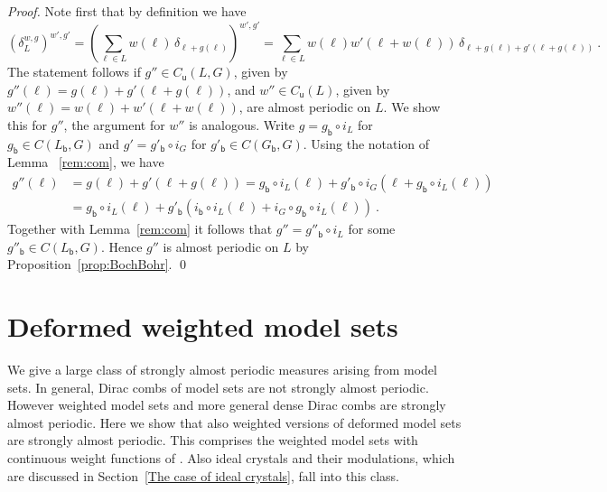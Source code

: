 \documentclass[11pt, a4wide]{amsart}
\numberwithin{lemma}{section}
\begin{document}
\begin{proof}
Note first that by definition we have
%
\begin{displaymath}
(\delta_L^{w,g})^{w',g'} = \left(\sum_{\ell\in L} w(\ell) \, \delta_{\ell+g(\ell)}\right)^{w',g'}
=\sum_{\ell \in L} w(\ell) w'(\ell+w(\ell)) \, \delta_{\ell+g(\ell)+g'(\ell+g(\ell))} \ .
\end{displaymath}
%
The statement follows if $g''\in C_\mathsf{u}(L, G)$, given by $g''(\ell)=g(\ell)+g'(\ell+g(\ell))$, and $w''\in C_\mathsf{u}(L)$, given by $w''(\ell)=w(\ell)+w'(\ell+w(\ell))$, are almost periodic on $L$. We show this for $g''$, the argument for $w''$ is analogous. Write $g=g_\mathsf{b}\circ i_L$ for $g_\mathsf{b}\in C(L_\mathsf{b}, G)$ and $g'=g'_\mathsf{b}\circ i_G$ for $g'_\mathsf{b}\in C(G_\mathsf{b}, G)$. Using the notation of Lemma ~\ref{rem:com}, we have
%
\begin{displaymath}
\begin{split}
g''(\ell)&=g(\ell)+g'(\ell+g(\ell))=g_\mathsf{b}\circ i_L(\ell)+g'_\mathsf{b}\circ i_G(\ell+g_\mathsf{b}\circ i_L(\ell)) \\
&=g_\mathsf{b}\circ i_L (\ell)+g'_\mathsf{b}(i_\mathsf{b}\circ i_L(\ell)+i_G\circ g_\mathsf{b}\circ i_L(\ell))\ .
\end{split}
\end{displaymath}
%
Together with  Lemma~\ref{rem:com} it follows that $g''=g''_\mathsf{b} \circ i_L$ for some $g''_\mathsf{b}\in C(L_\mathsf{b}, G)$. Hence $g''$ is almost periodic on $L$ by Proposition~\ref{prop:BochBohr}.
%
\qed
\end{proof}



\section{Deformed weighted model sets }\label{Smoothly}

We give a large class of strongly almost periodic measures arising from model sets.
In general, Dirac combs of model sets are not strongly almost periodic. However weighted model sets \cite{BL} and more general dense Dirac combs \cite{LR} are strongly almost periodic.
Here we show that also weighted versions of deformed model sets \cite{BD,BL2} are strongly almost periodic. This comprises the weighted model sets with continuous weight functions of \cite{BM,LR,Ric,NS11}. Also ideal crystals and their modulations, which are discussed  in Section~\ref{The case of ideal crystals}, fall into this class.
\end{document}
